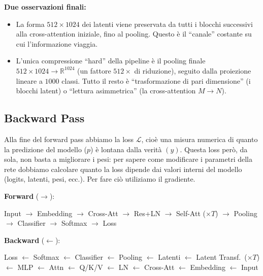\documentclass[
  11pt,
]{article}
\begin{document}
\begin{notabox}[title={\textbf{Checkpoint dimensioni finale --- fine \S1.4 (Forward Pass completo)}}]
\medskip
\textbf{Due osservazioni finali:}
\begin{itemize}\setlength\itemsep{0.2em}
\item La forma $512 \times 1024$ dei latenti viene preservata da tutti i blocchi successivi alla cross-attention iniziale, fino al pooling. Questo è il ``canale'' costante su cui l'informazione viaggia.
\item L'unica compressione ``hard'' della pipeline è il pooling finale $512 \times 1024 \to \mathbb{R}^{1024}$ (un fattore $512\times$ di riduzione), seguito dalla proiezione lineare a $1000$ classi. Tutto il resto è ``trasformazione di pari dimensione'' (i blocchi latent) o ``lettura asimmetrica'' (la cross-attention $M \to N$).
\end{itemize}
\end{notabox}

\subsection{Backward Pass}
\label{sec:backward}

Alla fine del forward pass abbiamo la loss \(\mathcal{L}\), cioè una
misura numerica di quanto la predizione del modello (\(p\)) è lontana
dalla verità \((y)\). Questa loss però, da sola, non basta a migliorare
i pesi: per sapere come modificare i parametri della rete dobbiamo
calcolare quanto la loss dipende dai valori interni del modello (logits,
latenti, pesi, ecc.). Per fare ciò utiliziamo il gradiente.

\begin{tcolorbox}[title={\textbf{Forward \& Backward Pass --- Overview}},
  colback=white, colframe=seccolor!70, boxrule=0.6pt, arc=4pt,
  left=6pt, right=6pt, top=6pt, bottom=6pt,
  fonttitle=\small, coltitle=white, colbacktitle=seccolor!70, breakable]
{\small\textbf{Forward} ($\longrightarrow$):\par
\smallskip
Input $\to$ Embedding $\to$ Cross-Att $\to$ Res+LN $\to$ Self-Att ($\times T$) $\to$ Pooling $\to$ Classifier $\to$ Softmax $\to$ Loss}
\tcblower
{\small\textbf{Backward} ($\longleftarrow$):\par
\smallskip
Loss $\leftarrow$ Softmax $\leftarrow$ Classifier $\leftarrow$ Pooling $\leftarrow$ Latenti $\leftarrow$ Latent Transf.\ ($\times T$) $\leftarrow$ MLP $\leftarrow$ Attn $\leftarrow$ Q/K/V $\leftarrow$ LN $\leftarrow$ Cross-Att $\leftarrow$ Embedding $\leftarrow$ Input}
\end{tcolorbox}
\end{document}
